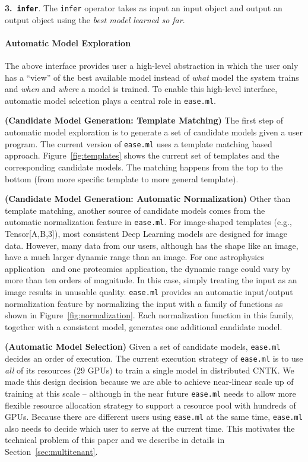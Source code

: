 \documentclass[letterpaper]{vldb}
\newcommand{\eml}{\texttt{ease.ml}\xspace}
\begin{document}
\noindent
{\textbf{3.~\texttt{infer}}.} The \texttt{infer} operator
takes as input an input object and output an output object
using the {\em best model learned so far}.

\paragraph*{Automatic Model Exploration}

The above interface provides user a high-level abstraction
in which the user only has a ``view'' of the best available model
instead of {\em what} model the system trains and 
{\em when} and {\em where} a model is trained. To enable 
this high-level interface, automatic model selection plays a
central role in \eml.

\vspace{0.5em}
\noindent
{\bf (Candidate Model Generation: Template Matching)} 
The first step of automatic
model exploration is to generate a set of 
candidate models given a user program. The current
version of \eml uses a template matching based approach.
Figure~\ref{fig:templates} shows the current set of
templates and the corresponding candidate models. 
The matching happens from the top to the bottom 
(from more specific template to more general template).

\vspace{0.5em}
\noindent
{\bf (Candidate Model Generation: Automatic Normalization)} 
Other than template matching, another source of candidate models 
comes from the automatic normalization feature 
in \eml. For image-shaped templates (e.g., Tensor[A,B,3]),
most consistent Deep Learning models are designed for
image data. However, many data from our users, although
has the shape like an image, have a much larger dynamic
range than an image. For one astrophysics application~\cite{MNRAS}
and one proteomics application, the dynamic range could
vary by more than ten orders of magnitude. In this case,
simply treating the input as an image results in unusable 
quality. \eml provides an automatic input/output
normalization feature by normalizing the input
with a family of functions as shown in Figure~\ref{fig:normalization}.
Each normalization function in this family, together with 
a consistent model, generates one additional 
candidate model.

\vspace{0.5em}
\noindent
{\bf (Automatic Model Selection)} 
Given a set of candidate models, \eml decides an order of
execution. The current execution strategy of \eml is to 
use {\em all} of its resources (29 GPUs) to train a single 
model in distributed CNTK. We made this design decision 
because we are able to achieve near-linear scale up
of training at this scale -- although in the near 
future \eml needs to allow more flexible resource 
allocation strategy to support a resource pool 
with hundreds of GPUs. Because there are different
users using \eml at the same time, \eml also needs
to decide which user to serve at the current time.
This motivates the technical problem of this paper
and we describe in details in Section~\ref{sec:multitenant}.
\end{document}
